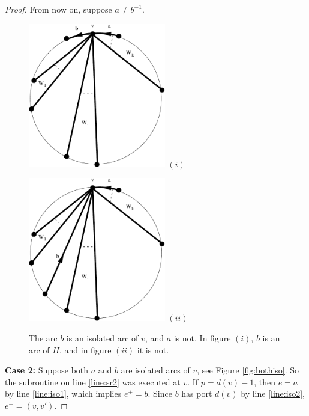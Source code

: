 \documentclass[12pt,letterpaper,oneside]{book}
\begin{document}
\begin{proof}
From now on, suppose $a\ne b^{-1}$.  

\begin{figure}[htp] 
\begin{minipage}[b]{0.5\linewidth}
\centering 
\includegraphics[width=6cm]{onlybisoh.pdf}
\newline
$(i)$
\end{minipage}
\hspace{0.5cm}
\begin{minipage}[b]{0.5\linewidth}
\centering
\includegraphics[width=6cm]{onlybiso.pdf}
\newline
$(ii)$
\end{minipage}
\caption[The outgoing arc of a vertex is isolated]{The arc $b$ is an isolated arc of $v$, and $a$ is not.  In figure $(i)$, $b$ is an 
arc of $H$, and in figure $(ii)$ it is not.  \label{fig:onlybi}}
\end{figure}




\noindent\textbf{Case 2: } Suppose both $a$ and $b$ are isolated arcs of $v$, see Figure \ref{fig:bothiso}.  
So the subroutine on line \ref{line:sr2} was executed at $v$.  
If $p=d(v)-1$, then $e=a$ by line \ref{line:iso1}, which implies $e^+=b$.  
Since $b$ has port $d(v)$ by line \ref{line:iso2}, $e^+=(v,v')$. %



\end{proof}
\end{document}
